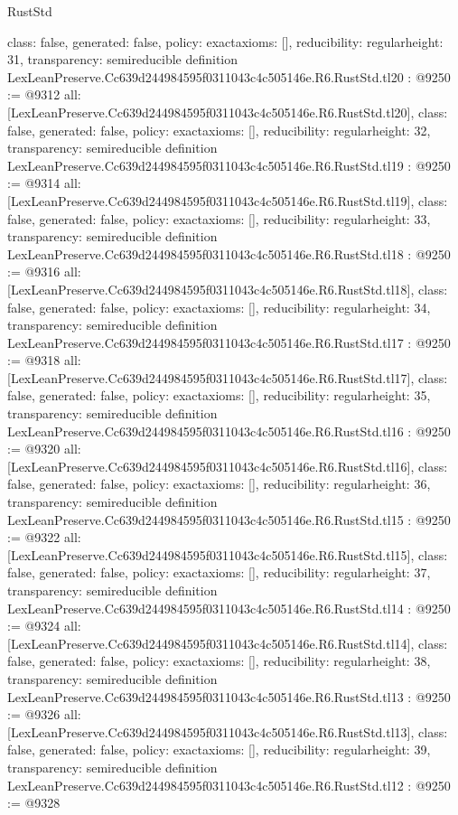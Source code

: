 \begin{lexlean}{RustStd}
\begin{coremodule}
{  class: false,
  generated: false,
  policy: exact{axioms: []},
  reducibility: regular{height: 31},
  transparency: semireducible
}
definition LexLeanPreserve.Cc639d244984595f0311043c4c505146e.R6.RustStd.tl20 : @9250 := @9312 {
  all: [LexLeanPreserve.Cc639d244984595f0311043c4c505146e.R6.RustStd.tl20],
  class: false,
  generated: false,
  policy: exact{axioms: []},
  reducibility: regular{height: 32},
  transparency: semireducible
}
definition LexLeanPreserve.Cc639d244984595f0311043c4c505146e.R6.RustStd.tl19 : @9250 := @9314 {
  all: [LexLeanPreserve.Cc639d244984595f0311043c4c505146e.R6.RustStd.tl19],
  class: false,
  generated: false,
  policy: exact{axioms: []},
  reducibility: regular{height: 33},
  transparency: semireducible
}
definition LexLeanPreserve.Cc639d244984595f0311043c4c505146e.R6.RustStd.tl18 : @9250 := @9316 {
  all: [LexLeanPreserve.Cc639d244984595f0311043c4c505146e.R6.RustStd.tl18],
  class: false,
  generated: false,
  policy: exact{axioms: []},
  reducibility: regular{height: 34},
  transparency: semireducible
}
definition LexLeanPreserve.Cc639d244984595f0311043c4c505146e.R6.RustStd.tl17 : @9250 := @9318 {
  all: [LexLeanPreserve.Cc639d244984595f0311043c4c505146e.R6.RustStd.tl17],
  class: false,
  generated: false,
  policy: exact{axioms: []},
  reducibility: regular{height: 35},
  transparency: semireducible
}
definition LexLeanPreserve.Cc639d244984595f0311043c4c505146e.R6.RustStd.tl16 : @9250 := @9320 {
  all: [LexLeanPreserve.Cc639d244984595f0311043c4c505146e.R6.RustStd.tl16],
  class: false,
  generated: false,
  policy: exact{axioms: []},
  reducibility: regular{height: 36},
  transparency: semireducible
}
definition LexLeanPreserve.Cc639d244984595f0311043c4c505146e.R6.RustStd.tl15 : @9250 := @9322 {
  all: [LexLeanPreserve.Cc639d244984595f0311043c4c505146e.R6.RustStd.tl15],
  class: false,
  generated: false,
  policy: exact{axioms: []},
  reducibility: regular{height: 37},
  transparency: semireducible
}
definition LexLeanPreserve.Cc639d244984595f0311043c4c505146e.R6.RustStd.tl14 : @9250 := @9324 {
  all: [LexLeanPreserve.Cc639d244984595f0311043c4c505146e.R6.RustStd.tl14],
  class: false,
  generated: false,
  policy: exact{axioms: []},
  reducibility: regular{height: 38},
  transparency: semireducible
}
definition LexLeanPreserve.Cc639d244984595f0311043c4c505146e.R6.RustStd.tl13 : @9250 := @9326 {
  all: [LexLeanPreserve.Cc639d244984595f0311043c4c505146e.R6.RustStd.tl13],
  class: false,
  generated: false,
  policy: exact{axioms: []},
  reducibility: regular{height: 39},
  transparency: semireducible
}
definition LexLeanPreserve.Cc639d244984595f0311043c4c505146e.R6.RustStd.tl12 : @9250 := @9328 {
}
\end{coremodule}
\end{lexlean}

